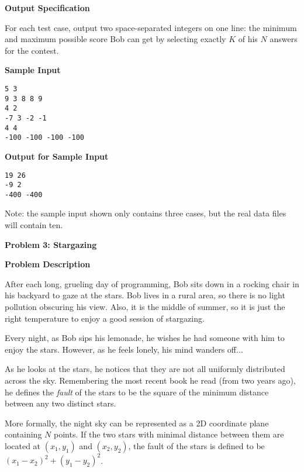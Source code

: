 \documentclass[11pt]{article}
\newcommand{\problem}[2]{\textbf{\Large Problem #1: #2} \vspace{0.4em}}
\newcommand{\heading}[1]{\vspace{0.6em} \textbf{#1}}
\begin{document}
\heading{Output Specification}

For each test case, output two space-separated integers on one line: the minimum and maximum possible score Bob can get by selecting exactly $K$ of his $N$ answers for the contest.


\heading{Sample Input}
\vspace{-\topsep}
\begin{verbatim}
5 3
9 3 8 8 9
4 2
-7 3 -2 -1
4 4
-100 -100 -100 -100
\end{verbatim}

\vspace{-\topsep}
\heading{Output for Sample Input}
\vspace{-\topsep}
\begin{verbatim}
19 26
-9 2
-400 -400
\end{verbatim}

Note: the sample input shown only contains three cases, but the real data files will contain ten.


\pagebreak




\problem{3}{Stargazing}


\heading{Problem Description}

After each long, grueling day of programming, Bob sits down in a rocking chair in his backyard to gaze at the stars. Bob lives in a rural area, so there is no light pollution obscuring his view. Also, it is the middle of summer, so it is just the right temperature to enjoy a good session of stargazing.

Every night, as Bob sips his lemonade, he wishes he had someone with him to enjoy the stars. However, as he feels lonely, his mind wanders off...

As he looks at the stars, he notices that they are not all uniformly distributed across the sky. Remembering the most recent book he read (from two years ago), he defines the \textit{fault} of the stars to be the square of the minimum distance between any two distinct stars.

More formally, the night sky can be represented as a 2D coordinate plane containing $N$ points. If the two stars with minimal distance between them are located at $(x_1, y_1)$ and $(x_2, y_2)$, the fault of the stars is defined to be $(x_1 - x_2)^2 + (y_1 - y_2)^2$.
\end{document}
